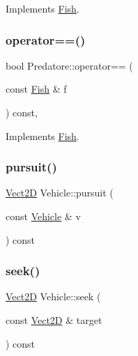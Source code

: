 Implements \hyperlink{classFish_aa739aa5c06ff6054b051047bccd3bf6f_aa739aa5c06ff6054b051047bccd3bf6f}{Fish}.

\mbox{\label{classPredatore_a5633b0cdab96d56d7d0aca7f7b046ac6_a5633b0cdab96d56d7d0aca7f7b046ac6}} 
\subsubsection{\texorpdfstring{operator==()}{operator==()}}
{\footnotesize\ttfamily bool Predatore\+::operator== (\begin{DoxyParamCaption}\item[{const \hyperlink{classFish}{Fish} \&}]{f }\end{DoxyParamCaption}) const\hspace{0.3cm}{\ttfamily [override]}, {\ttfamily [virtual]}}



Implements \hyperlink{classFish_a3abf96fe9cda276a4b3827464e2b0519_a3abf96fe9cda276a4b3827464e2b0519}{Fish}.

\mbox{\label{classVehicle_a9dd4f4a06b4abd3324d317c27bb867d2_a9dd4f4a06b4abd3324d317c27bb867d2}} 
\subsubsection{\texorpdfstring{pursuit()}{pursuit()}}
{\footnotesize\ttfamily \hyperlink{classVect2D}{Vect2D} Vehicle\+::pursuit (\begin{DoxyParamCaption}\item[{const \hyperlink{classVehicle}{Vehicle} \&}]{v }\end{DoxyParamCaption}) const\hspace{0.3cm}{\ttfamily [inherited]}}

\mbox{\label{classVehicle_a86c0b5ddcf64443bc090657cd29832bf_a86c0b5ddcf64443bc090657cd29832bf}} 
\subsubsection{\texorpdfstring{seek()}{seek()}}
{\footnotesize\ttfamily \hyperlink{classVect2D}{Vect2D} Vehicle\+::seek (\begin{DoxyParamCaption}\item[{const \hyperlink{classVect2D}{Vect2D} \&}]{target }\end{DoxyParamCaption}) const\hspace{0.3cm}{\ttfamily [inherited]}}

